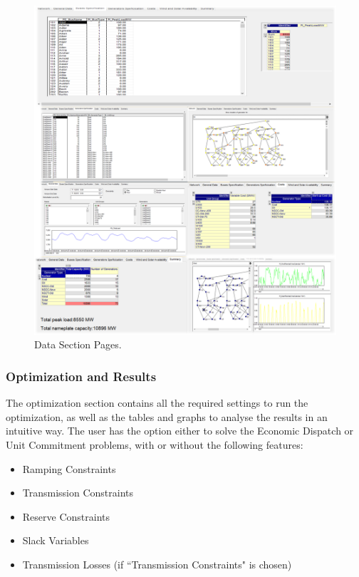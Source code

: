 \documentclass[12pt,LUDisStyle,twosided]{book}
\begin{document}
\newpage
\begin{figure}[H] 
	\begin{center}
		\includegraphics[width=\textwidth,height=\textheight,keepaspectratio]{aimmsDataPages.png}
	  	\caption{Data Section Pages.}
     	\label{fig:dataSectionPages}
	\end{center}
\end{figure}


\subsubsection{Optimization and Results}

The optimization section contains all the required settings to run the optimization, as well as the tables and graphs to analyse the results in an intuitive way. The user has the option either to solve the Economic Dispatch or Unit Commitment problems, with or without the following features:

\begin{itemize}
\item Ramping Constraints
\item Transmission Constraints
\item Reserve Constraints
\item Slack Variables
\item Transmission Losses (if ``Transmission Constraints" is chosen)
\end{itemize}
\end{document}
